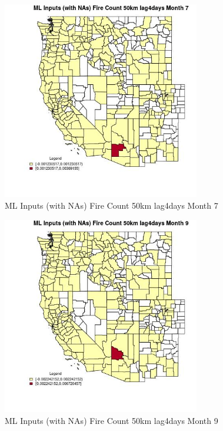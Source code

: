 \clearpage 

\begin{figure} 
\centering  
\includegraphics[width=0.77\textwidth]{Code_Outputs/Report_ML_input_PM25_Step4_part_e_de_duplicated_aves_compiled_2019-05-21wNAs_CountyFire_Count_50km_lag4daysmedianMonth7.jpg} 
\caption{\label{fig:Report_ML_input_PM25_Step4_part_e_de_duplicated_aves_compiled_2019-05-21wNAsCountyFire_Count_50km_lag4daysmedianMonth7}ML Inputs (with NAs) Fire Count 50km lag4days Month 7} 
\end{figure} 
 

\begin{figure} 
\centering  
\includegraphics[width=0.77\textwidth]{Code_Outputs/Report_ML_input_PM25_Step4_part_e_de_duplicated_aves_compiled_2019-05-21wNAs_CountyFire_Count_50km_lag4daysmedianMonth9.jpg} 
\caption{\label{fig:Report_ML_input_PM25_Step4_part_e_de_duplicated_aves_compiled_2019-05-21wNAsCountyFire_Count_50km_lag4daysmedianMonth9}ML Inputs (with NAs) Fire Count 50km lag4days Month 9} 
\end{figure} 
 


